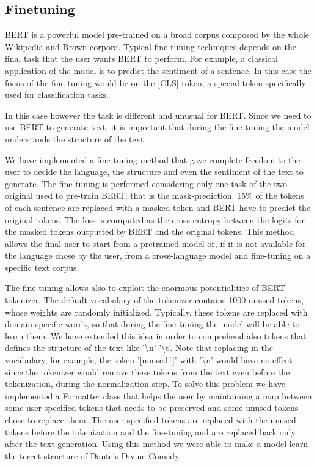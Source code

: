 \documentclass[10pt,twocolumn,letterpaper]{article}
\begin{document}
\subsection{Finetuning}
BERT is a powerful model pre-trained on a broad corpus composed by the whole
Wikipedia and Brown corpora.
Typical fine-tuning techniques depends on the final task that the user wants BERT to perform.
For example, a classical application of the model is to predict the sentiment of a sentence.
In this case the focus of the fine-tuning would be on the [CLS] token,
a special token specifically used for classification tasks.

In this case however the task is different and unusual for BERT.
Since we need to use BERT to generate text, it is important that during the
fine-tuning the model understands the structure of the text.

We have implemented a fine-tuning method that gave complete freedom to the user to decide the language,
the structure and even the sentiment of the text to generate.
The fine-tuning is performed considering only one task of the
two original used to pre-train BERT; that is the mask-prediction.
15\% of the tokens of each sentence are replaced with a masked token and
BERT have to predict the original tokens.
The loss is computed as the cross-entropy between the logits for the
masked tokens outputted by BERT and the original tokens.
This method allows the final user to start from a pretrained model or, if
it is not available for the language chose by the user, from a cross-language model
and fine-tuning on a specific text corpus.

The fine-tuning allows also to exploit the enormous potentialities of BERT tokenizer.
The default vocabulary of the tokenizer contains 1000 unused tokens,
whose weights are randomly initialized.
Typically, these tokens are replaced with domain specific words,
so that during the fine-tuning the model will be able to learn them.
We have extended this idea in order to comprehend also tokens that defines
the structure of the text like '\textbackslash n' '\textbackslash t'.
Note that replacing in the vocabulary, for example, the token '[unused1]'
with '\textbackslash n' would have no effect since the tokenizer would
remove these tokens from the text even before the tokenization,
during the normalization step.
To solve this problem we have implemented a Formatter class that helps
the user by maintaining a map between some user specified tokens that needs
to be preserved and some unused tokens chose to replace them.
The user-specified tokens are replaced with the unused tokens before
the tokenization and the fine-tuning and are replaced back only after the
text generation.
Using this method we were able to make a model learn the tercet structure
of Dante's Divine Comedy.
\end{document}

